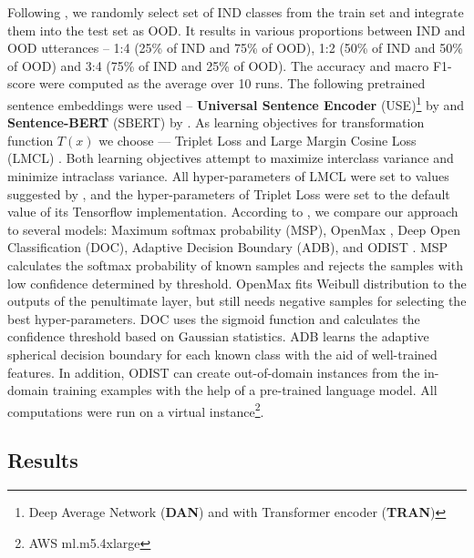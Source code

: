 \documentclass[runningheads]{llncs}
\begin{document}
Following \cite{zhang2021adaptive_decision_boundary}, we randomly select set of IND classes from the train set and integrate them into the test set as OOD. It results in various proportions between IND and OOD utterances -- 1:4 (25\% of IND and 75\% of OOD), 1:2 (50\% of IND and 50\% of OOD) and 3:4 (75\% of IND and 25\% of OOD). The accuracy and macro F1-score were computed as the average over 10 runs. 
The following pretrained sentence embeddings were used -- \textbf{Universal Sentence Encoder} (USE)\footnote{Deep Average Network (\textbf{DAN}) and with Transformer encoder (\textbf{TRAN})} by \cite{cer2018universal_sentence_encoder} and \textbf{Sentence-BERT} (SBERT) by \cite{reimers2019sentencebert}. 
As learning objectives for transformation function $T(x)$ we choose --- Triplet Loss \cite{hoffer2018deep_triplet_loss} and Large Margin Cosine Loss (LMCL) \cite{wang2018cosface}. Both learning objectives attempt to maximize interclass variance and minimize intraclass variance. All hyper-parameters of LMCL were set to values suggested by \cite{wang2018cosface}, and the hyper-parameters of Triplet Loss were set to the default value of its Tensorflow implementation. According to \cite{zhang2021adaptive_decision_boundary}, we compare our approach to several models: Maximum softmax probability \cite{baseline_msp} (MSP), OpenMax \cite{openMax}, Deep Open Classification \cite{shu2017doc} (DOC), Adaptive Decision Boundary \cite{zhang2021adaptive_decision_boundary} (ADB), and ODIST \cite{odist}. MSP calculates the softmax probability of known samples and rejects the samples with low confidence determined by threshold. OpenMax fits Weibull distribution to the outputs of the penultimate layer, but still needs negative samples for selecting the best hyper-parameters. DOC uses the sigmoid function and calculates the confidence threshold based on Gaussian statistics. ADB learns the adaptive spherical decision boundary for each known class with the aid of well-trained features. In addition, ODIST can create out-of-domain instances from the in-domain training examples with the help of a pre-trained language model. All computations were run on a virtual instance\footnote{AWS ml.m5.4xlarge}.









\subsection{Results}
\end{document}
